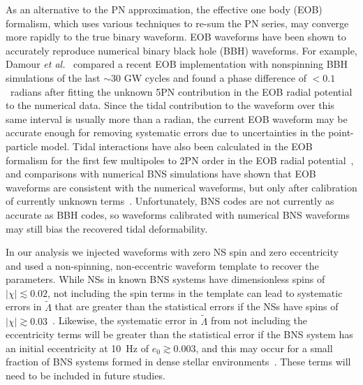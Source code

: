 \documentclass[twocolumn,prd,amssymb,aps,nofootinbib,showpacs,epsf]{revtex4}
\begin{document}
As an alternative to the PN approximation, the effective one body (EOB) formalism, which uses various techniques to re-sum the PN series, may converge more rapidly to the true binary waveform. EOB waveforms have been shown to accurately reproduce numerical binary black hole (BBH) waveforms. For example, Damour {\it et al.}~\cite{DamourNagarBernuzzi2013} compared a recent EOB implementation with nonspinning BBH simulations of the last $\sim 30$ GW cycles and found a phase difference of $<0.1$~radians after fitting the unknown 5PN contribution in the EOB radial potential to the numerical data. Since the tidal contribution to the waveform over this same interval is usually more than a radian, the current EOB waveform may be accurate enough for removing systematic errors due to uncertainties in the point-particle model. Tidal interactions have also been calculated in the EOB formalism for the first few multipoles to 2PN order in the EOB radial potential~\cite{BiniDamourFaye2012}, and comparisons with numerical BNS simulations have shown that EOB waveforms are consistent with the numerical waveforms, but only after calibration of currently unknown terms~\cite{BernuzziNagarThierfelder2012, HotokazakaKyutokuShibata2013}. Unfortunately, BNS codes are not currently as accurate as BBH codes, so waveforms calibrated with numerical BNS waveforms may still bias the recovered tidal deformability.

In our analysis we injected waveforms with zero NS spin and zero eccentricity and used a non-spinning, non-eccentric waveform template to recover the parameters. While NSs in known BNS systems have dimensionless spins of $|\chi| \lesssim 0.02$, not including the spin terms in the template can lead to systematic errors in $\tilde\Lambda$ that are greater than the statistical errors if the NSs have spins of $|\chi| \gtrsim 0.03$~\cite{Favata2014}. Likewise, the systematic error in $\tilde\Lambda$ from not including the eccentricity terms will be greater than the statistical error if the BNS system has an initial eccentricity at 10~Hz of $e_0 \gtrsim 0.003$, and this may occur for a small fraction of BNS systems formed in dense stellar environments~\cite{Favata2014}. These terms will need to be included in future studies.
\end{document}
